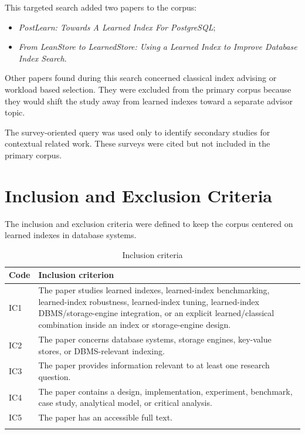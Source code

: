 \documentclass[a4paper, 12pt, twoside]{report}
\begin{document}
This targeted search added two papers to the corpus:

\begin{itemize}
\item \textit{PostLearn: Towards A Learned Index For PostgreSQL};
\item \textit{From LeanStore to LearnedStore: Using a Learned Index to Improve Database Index Search}.
\end{itemize}

Other papers found during this search concerned classical index advising or workload based selection. They were excluded from the primary corpus because they would shift the study away from learned indexes toward a separate advisor topic.

The survey-oriented query was used only to identify secondary studies for contextual related work. These surveys were cited but not included in the primary corpus.

\section{Inclusion and Exclusion Criteria}

The inclusion and exclusion criteria were defined to keep the corpus centered on learned indexes in database systems.

\begin{longtable}{|p{1.4cm}|p{12cm}|}
\hline
\textbf{Code} & \textbf{Inclusion criterion} \\
\hline
IC1 & The paper studies learned indexes, learned-index benchmarking, learned-index robustness, learned-index tuning, learned-index DBMS/storage-engine integration, or an explicit learned/classical combination inside an index or storage-engine design. \\
\hline
IC2 & The paper concerns database systems, storage engines, key-value stores, or DBMS-relevant indexing. \\
\hline
IC3 & The paper provides information relevant to at least one research question. \\
\hline
IC4 & The paper contains a design, implementation, experiment, benchmark, case study, analytical model, or critical analysis. \\
\hline
IC5 & The paper has an accessible full text. \\
\hline
\caption{Inclusion criteria}
\label{tab:inclusion-criteria}
\end{longtable}
\end{document}
